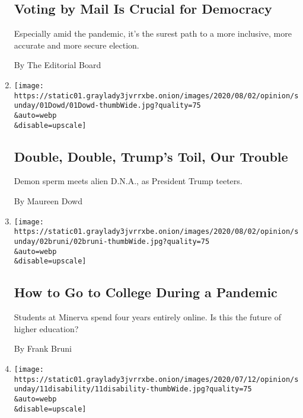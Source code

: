 \begin{enumerate}
  \hypertarget{voting-by-mail-is-crucial-for-democracy}{%
  \subsection{Voting by Mail Is Crucial for
  Democracy}\label{voting-by-mail-is-crucial-for-democracy}}

  Especially amid the pandemic, it's the surest path to a more
  inclusive, more accurate and more secure election.

  By The Editorial Board
\item
  \href{/2020/08/01/opinion/sunday/trump-coronavirus-herman-cain.html}{}

  \texttt{[image: https://static01.graylady3jvrrxbe.onion/images/2020/08/02/opinion/sunday/01Dowd/01Dowd-thumbWide.jpg?quality=75\\\&auto=webp\\\&disable=upscale]}

  \hypertarget{double-double-trumps-toil-our-trouble-1}{%
  \subsection{Double, Double, Trump's Toil, Our
  Trouble}\label{double-double-trumps-toil-our-trouble-1}}

  Demon sperm meets alien D.N.A., as President Trump teeters.

  By Maureen Dowd
\item
  \href{/2020/08/01/opinion/sunday/minerva-college-coronavirus.html}{}

  \texttt{[image: https://static01.graylady3jvrrxbe.onion/images/2020/08/02/opinion/sunday/02bruni/02bruni-thumbWide.jpg?quality=75\\\&auto=webp\\\&disable=upscale]}

  \hypertarget{how-to-go-to-college-during-a-pandemic}{%
  \subsection{How to Go to College During a
  Pandemic}\label{how-to-go-to-college-during-a-pandemic}}

  Students at Minerva spend four years entirely online. Is this the
  future of higher education?

  By Frank Bruni
\item
  \href{/2020/08/01/opinion/letters/disability-law.html}{}

  \texttt{[image: https://static01.graylady3jvrrxbe.onion/images/2020/07/12/opinion/sunday/11disability/11disability-thumbWide.jpg?quality=75\\\&auto=webp\\\&disable=upscale]}


\end{enumerate}
